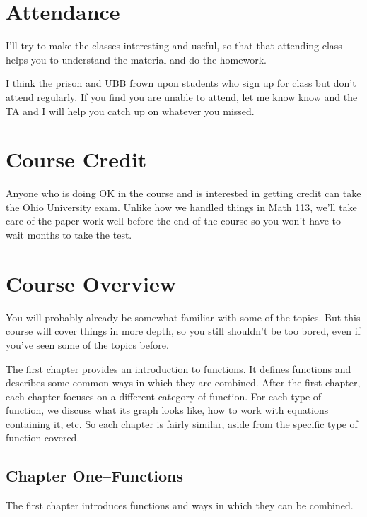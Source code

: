 \documentclass{article}
\begin{document}
\section{Attendance}
I'll try to make the classes interesting and useful, so that that attending class helps you to understand the
material and do the homework.

I think the prison and UBB frown upon students who sign up for class but don't attend regularly.  If you find you are
unable to attend, let me know know and the TA and I will help you catch up on whatever you missed.

\section{Course Credit}
Anyone who is doing OK in the course and is interested in getting credit can take the Ohio University exam.
Unlike how we handled things in Math 113, we'll take care of the paper work well before the end of the course so you won't
have to wait months to take the test.

\section{Course Overview}


You will probably already be somewhat familiar with some of the topics.  But this course will cover things in more
depth, so you still shouldn't be too bored, even if you've seen some of the topics before.

The first chapter provides an introduction to functions.  It defines functions and describes some common ways in which
they are combined.  After the first chapter, each chapter focuses on a different category of function.  For each type of
function, we discuss what its graph looks like, how to work with equations containing it, etc.  So each chapter is fairly
similar, aside from the specific type of function covered.

\subsection{Chapter One--Functions}
The first chapter introduces functions and ways in which they can be combined.  
\end{document}
